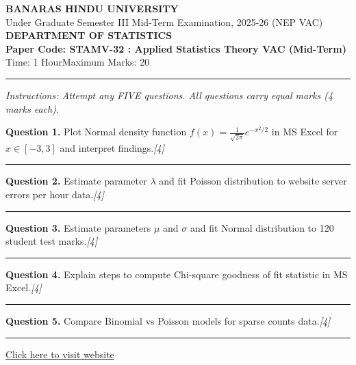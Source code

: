 \documentclass[11pt,a4paper]{article}
\newcommand{\pts}[1]{\hfill   \textit{[#1]}}
\begin{document}
\begin{center}
  {\large\bfseries BANARAS HINDU UNIVERSITY}\\[2pt]
  {\normalsize Under Graduate Semester III Mid-Term Examination, 2025-26 (NEP VAC)}\\[6pt]
  {\large\bfseries DEPARTMENT OF STATISTICS}\\[4pt]
  {\large\bfseries Paper Code: STAMV-32 : Applied Statistics Theory VAC (Mid-Term)}\\[4pt]
  {\normalsize Time: 1 Hour\hfill Maximum Marks: 20}
\end{center}
\rule{\linewidth}{0.4pt}\smallskip



\noindent   \textit{Instructions: Attempt any FIVE questions. All questions carry equal marks (4 marks each).}
\bigskip




\noindent   \textbf{Question 1.} Plot Normal density function $f(x) = \frac{1}{\sqrt{2\pi}} e^{-x^2 / 2}$ in MS Excel for $x \in [-3, 3]$ and interpret findings.\pts{4}

\medskip\rule{\linewidth}{0.2pt}\medskip




\noindent   \textbf{Question 2.} Estimate parameter $\lambda$ and fit Poisson distribution to website server errors per hour data.\pts{4}

\medskip\rule{\linewidth}{0.2pt}\medskip




\noindent   \textbf{Question 3.} Estimate parameters $\mu$ and $\sigma$ and fit Normal distribution to 120 student test marks.\pts{4}

\medskip\rule{\linewidth}{0.2pt}\medskip




\noindent   \textbf{Question 4.} Explain steps to compute Chi-square goodness of fit statistic in MS Excel.\pts{4}

\medskip\rule{\linewidth}{0.2pt}\medskip




\noindent   \textbf{Question 5.} Compare Binomial vs Poisson models for sparse counts data.\pts{4}

\vfill\rule{\linewidth}{0.4pt}

\begin{center}\small\href{https://bhu-exam.vercel.app/}{Click here to visit website}\end{center}
\end{document}
